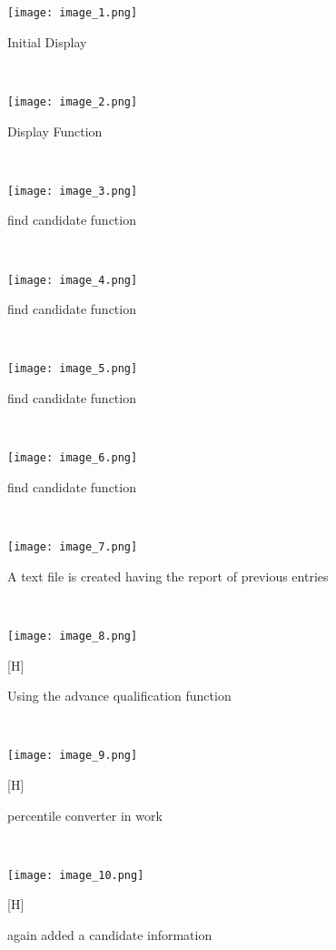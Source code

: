 \documentclass{article}
\begin{document}
\begin{figure}
    \begin{center}
        \texttt{[image: image\_1.png]}
    \end{center}
    \caption{Initial Display}
    \label{fig:my_label}
\end{figure}
\\
\begin{figure}
    \centering
    \texttt{[image: image\_2.png]}
    \caption{Display Function}
\end{figure}
\\
\begin{figure}
    \centering
    \texttt{[image: image\_3.png]}
    \caption{find candidate function}
\end{figure}

\\
\begin{figure}
    \centering
    \texttt{[image: image\_4.png]}
    \caption{find candidate function}
\end{figure}

\\
\begin{figure}
    \centering
    \texttt{[image: image\_5.png]}
    \caption{find candidate function}
\end{figure}

\\
\begin{figure}
    \centering
    \texttt{[image: image\_6.png]}
    \caption{find candidate function}
\end{figure}

\\
\begin{figure}
    \centering
    \texttt{[image: image\_7.png]}
    \caption{A text file is created having the report of previous entries }
\end{figure}

\\
\begin{figure}
    \centering
    \texttt{[image: image\_8.png]}
    \caption{Using the advance qualification function}[H]
\end{figure}

\\
\begin{figure}
    \centering
    \texttt{[image: image\_9.png]}
    \caption{percentile converter in work}[H]
\end{figure}
\pagebreak

\\
\begin{figure}
    \centering
    \texttt{[image: image\_10.png]}
    \caption{again added a candidate information}[H]
\end{figure}
\end{document}
